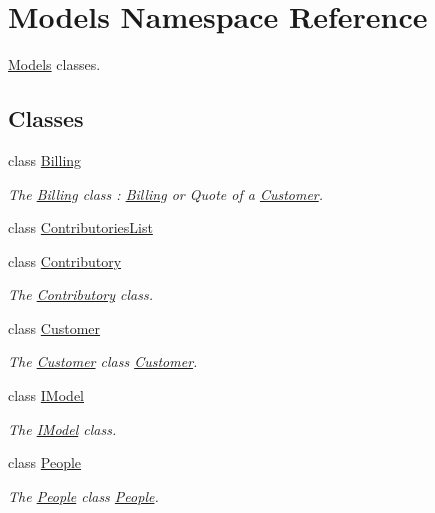 \hypertarget{namespaceModels}{\section{Models Namespace Reference}
\label{namespaceModels}
}


\hyperlink{namespaceModels}{Models} classes.  


\subsection*{Classes}
\begin{DoxyCompactItemize}
\item 
class \hyperlink{classModels_1_1Billing}{Billing}
\begin{DoxyCompactList}\small\item\em The \hyperlink{classModels_1_1Billing}{Billing} class \-: \hyperlink{classModels_1_1Billing}{Billing} or Quote of a \hyperlink{classModels_1_1Customer}{Customer}. \end{DoxyCompactList}\item 
class \hyperlink{classModels_1_1ContributoriesList}{Contributories\-List}
\item 
class \hyperlink{classModels_1_1Contributory}{Contributory}
\begin{DoxyCompactList}\small\item\em The \hyperlink{classModels_1_1Contributory}{Contributory} class. \end{DoxyCompactList}\item 
class \hyperlink{classModels_1_1Customer}{Customer}
\begin{DoxyCompactList}\small\item\em The \hyperlink{classModels_1_1Customer}{Customer} class \hyperlink{classModels_1_1Customer}{Customer}. \end{DoxyCompactList}\item 
class \hyperlink{classModels_1_1IModel}{I\-Model}
\begin{DoxyCompactList}\small\item\em The \hyperlink{classModels_1_1IModel}{I\-Model} class. \end{DoxyCompactList}\item 
class \hyperlink{classModels_1_1People}{People}
\begin{DoxyCompactList}\small\item\em The \hyperlink{classModels_1_1People}{People} class \hyperlink{classModels_1_1People}{People}. \end{DoxyCompactList}\item 

\end{DoxyCompactItemize}
